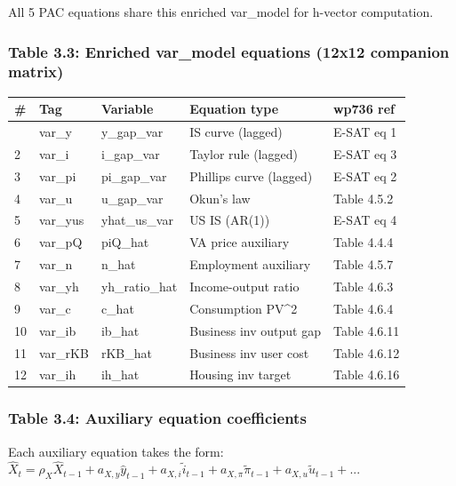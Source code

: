 \documentclass[
]{article}
\newcounter{none} %
\begin{document}
All 5 PAC equations share this enriched var\_model for h-vector
computation.

\subsubsection{Table 3.3: Enriched var\_model equations (12x12 companion
matrix)}\label{table-3.3-enriched-var_model-equations-12x12-companion-matrix}

{\def\LTcaptype{none} %
\begin{longtable}[]{@{}lllll@{}}
\toprule\noalign{}
\# & Tag & Variable & Equation type & wp736 ref \\
\midrule\noalign{}
\endhead
\bottomrule\noalign{}
\endlastfoot
1 & var\_y & y\_gap\_var & IS curve (lagged) & E-SAT eq 1 \\
2 & var\_i & i\_gap\_var & Taylor rule (lagged) & E-SAT eq 3 \\
3 & var\_pi & pi\_gap\_var & Phillips curve (lagged) & E-SAT eq 2 \\
4 & var\_u & u\_gap\_var & Okun's law & Table 4.5.2 \\
5 & var\_yus & yhat\_us\_var & US IS (AR(1)) & E-SAT eq 4 \\
6 & var\_pQ & piQ\_hat & VA price auxiliary & Table 4.4.4 \\
7 & var\_n & n\_hat & Employment auxiliary & Table 4.5.7 \\
8 & var\_yh & yh\_ratio\_hat & Income-output ratio & Table 4.6.3 \\
9 & var\_c & c\_hat & Consumption PV\^{}2 & Table 4.6.4 \\
10 & var\_ib & ib\_hat & Business inv output gap & Table 4.6.11 \\
11 & var\_rKB & rKB\_hat & Business inv user cost & Table 4.6.12 \\
12 & var\_ih & ih\_hat & Housing inv target & Table 4.6.16 \\
\end{longtable}
}

\subsubsection{Table 3.4: Auxiliary equation
coefficients}\label{table-3.4-auxiliary-equation-coefficients}

Each auxiliary equation takes the form:
\(\hat{X}_t = \rho_X \hat{X}_{t-1} + a_{X,y} \hat{y}_{t-1} + a_{X,i} \tilde{i}_{t-1} + a_{X,\pi} \tilde{\pi}_{t-1} + a_{X,u} \tilde{u}_{t-1} + ...\)
\end{document}
